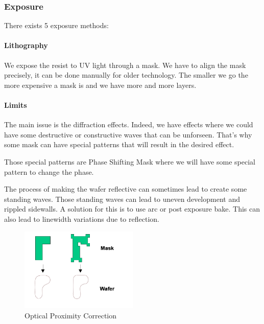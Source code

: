 \documentclass[
]{article}
\begin{document}
\hypertarget{exposure}{%
\subsubsection{Exposure}\label{exposure}}

There exists 5 exposure methods:

\hypertarget{lithography}{%
\paragraph{Lithography}\label{lithography}}

We expose the resist to UV light through a mask. We have to align the
mask precisely, it can be done manually for older technology. The
smaller we go the more expensive a mask is and we have more and more
layers.

\hypertarget{limits}{%
\paragraph{Limits}\label{limits}}

The main issue is the diffraction effects. Indeed, we have effects where
we could have some destructive or constructive waves that can be
unforseen. That's why some mask can have special patterns that will
result in the desired effect.

Those special patterns are Phase Shifting Mask where we will have some
special pattern to change the phase.

The process of making the wafer reflective can sometimes lead to create
some standing waves. Those standing waves can lead to uneven development
and rippled sidewalls. A solution for this is to use {arc} or post
exposure bake. This can also lead to linewidth variations due to
reflection.

\begin{figure}
\hypertarget{fig:enter-label}{%
\centering
\includegraphics[width=0.5\textwidth,height=\textheight]{OPC.png}
\caption{Optical Proximity Correction}\label{fig:enter-label}
}
\end{figure}
\end{document}
